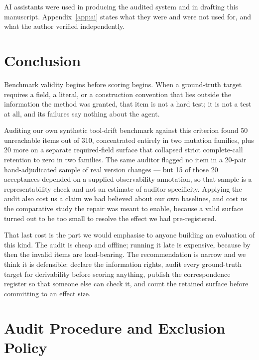 \documentclass[11pt]{article}
\begin{document}
AI assistants were used in producing the audited system and in drafting this
manuscript. Appendix~\ref{app:ai} states what they were and were not used for,
and what the author verified independently.

\section{Conclusion}

Benchmark validity begins before scoring begins. When a ground-truth target
requires a field, a literal, or a construction convention that lies outside
the information the method was granted, that item is not a hard test; it is
not a test at all, and its failures say nothing about the agent.

Auditing our own synthetic tool-drift benchmark against this criterion found
50 unreachable items out of 310, concentrated entirely in two mutation
families, plus 20 more on a separate required-field surface that collapsed
strict complete-call retention to zero in two families. The same auditor flagged no
item in a 20-pair hand-adjudicated sample of real version changes --- but 15 of
those 20 acceptances depended on a supplied observability annotation, so that
sample is a representability check and not an estimate of auditor specificity. Applying the audit
also cost us a claim we had believed about our own baselines, and cost us the
comparative study the repair was meant to enable, because a valid surface
turned out to be too small to resolve the effect we had pre-registered.

That last cost is the part we would emphasise to anyone building an evaluation
of this kind. The audit is cheap and offline; running it late is expensive,
because by then the invalid items are load-bearing. The recommendation is
narrow and we think it is defensible: declare the information rights, audit
every ground-truth target for derivability before scoring anything, publish
the correspondence register so that someone else can check it, and count the
retained surface before committing to an effect size.

\appendix

\section{Audit Procedure and Exclusion Policy}
\label{app:procedure}
\end{document}
